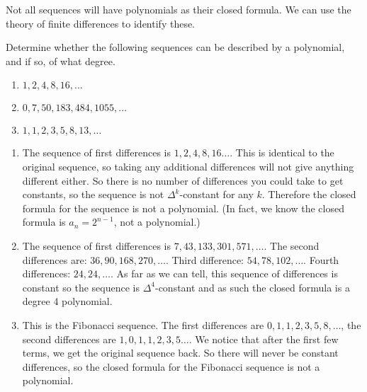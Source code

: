 \documentclass[12pt]{article}
\begin{document}
Not all sequences will have polynomials as their closed formula.  We can use the theory of finite differences to identify these.

\begin{example}
  Determine whether the following sequences can be described by a polynomial, and if so, of what degree.
  \begin{enumerate}
    \item $1, 2, 4, 8, 16, \ldots$
    \item $0, 7, 50, 183, 484, 1055, \ldots$
    \item $1,1,2,3,5,8,13,\ldots$
  \end{enumerate}
\begin{solution}
  \begin{enumerate}
    \item The sequence of first differences is $1, 2, 4, 8, 16\ldots$.  This is identical to the original sequence, so taking any additional differences will not give anything different either.  So there is no number of differences you could take to get constants, so the sequence is not $\Delta^k$-constant for any $k$.  Therefore the closed formula for the sequence is not a polynomial.  (In fact, we know the closed formula is $a_n = 2^{n-1}$, not a polynomial.)
    \item The sequence of first differences is $7, 43, 133, 301, 571,\ldots$.  The second differences are: $36, 90, 168, 270,\ldots$.  Third difference: $54, 78, 102,\ldots$.  Fourth differences: $24, 24, \ldots$.  As far as we can tell, this sequence of differences is constant so the sequence is $\Delta^4$-constant and as such the closed formula is a degree 4 polynomial.
    \item This is the Fibonacci sequence.  The first differences are $0, 1, 1, 2, 3, 5, 8, \ldots$, the second differences are $1, 0, 1, 1, 2, 3,5\ldots$.  We notice that after the first few terms, we get the original sequence back.  So there will never be constant differences, so the closed formula for the Fibonacci sequence is not a polynomial.
  \end{enumerate}

\end{solution}

\end{example}
\end{document}
